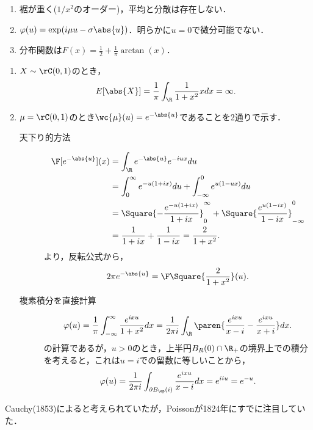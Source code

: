 \documentclass[uplatex,dvipdfmx]{jsreport}
\begin{document}
\begin{proposition}\mbox{}
    \begin{enumerate}
        \item 裾が重く($1/x^2$のオーダー)，平均と分散は存在しない．
        \item $\varphi(u)=\exp(i\mu u-\sigma\abs{u})$．明らかに$u=0$で微分可能でない．
        \item 分布関数は$F(x)=\frac{1}{2}+\frac{1}{\pi}\arctan(x)$．
    \end{enumerate}
\end{proposition}
\begin{Proof}\mbox{}
    \begin{enumerate}
        \item $X\sim\rC(0,1)$のとき，
        \[E[\abs{X}]=\frac{1}{\pi}\int_\R\frac{1}{1+x^2}xdx=\infty.\]
        \item $\mu=\rC(0,1)$のとき$\wc{\mu}(u)=e^{-\abs{u}}$であることを2通りで示す．
        \begin{description}
            \item[天下り的方法] 
            \begin{align*}
                \F[e^{-\abs{u}}](x)&=\int_\R e^{-\abs{u}}e^{-iux}du\\
                &=\int^\infty_0e^{-u(1+ix)}du+\int^0_{-\infty}e^{u(1-ux)}du\\
                &=\Square{-\frac{e^{-u(1+ix)}}{1+ix}}^\infty_0+\Square{\frac{e^{u(1-ix)}}{1-ix}}^0_{-\infty}\\
                &=\frac{1}{1+ix}+\frac{1}{1-ix}=\frac{2}{1+x^2}.
            \end{align*}
            より，反転公式から，
            \[2\pi e^{-\abs{u}}=\F\Square{\frac{2}{1+x^2}}(u).\]
            \item[複素積分を直接計算] 
            \[\varphi(u)=\frac{1}{\pi}\int^\infty_{-\infty}\frac{e^{ixu}}{1+x^2}dx=\frac{1}{2\pi i}\int_\R\paren{\frac{e^{ixu}}{x-i}-\frac{e^{ixu}}{x+i}}dx.\]
            の計算であるが，$u>0$のとき，上半円$B_R(0)\cap\R_+$の境界上での積分を考えると，これは$u=i$での留数に等しいことから，
            \[\varphi(u)=\frac{1}{2\pi i}\int_{\partial B_\ep(i)}\frac{e^{ixu}}{x-i}dx=e^{iiu}=e^{-u}.\]
        \end{description}
    \end{enumerate}
\end{Proof}

\begin{history}
    Cauchy(1853)によると考えられていたが，Poissonが1824年にすでに注目していた．
\end{history}
\end{document}
